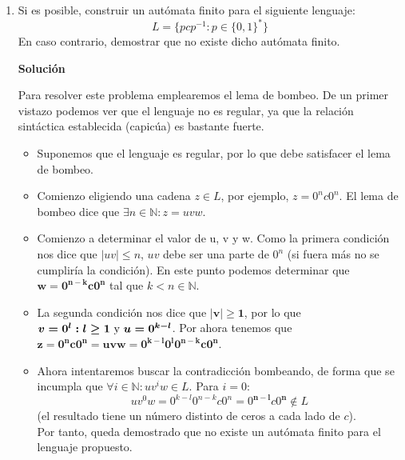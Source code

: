 \documentclass[12pt,spanish]{article}
\newenvironment{solution}{
	\par
	\textbf{Solución}
	\par
	\begin{center}
}
{
	\end{center}
}
\begin{document}
\begin{enumerate}
\begin{solution}
	\end{solution}
	\item Si es posible, construir un autómata finito para el siguiente lenguaje:
	\[
		L=\{pcp^{-1} : p \in \{0,1\}^{*}\}
	\]
	En caso contrario, demostrar que no existe dicho autómata finito.

	\begin{solution}
		Para resolver este problema emplearemos el lema de bombeo. De un primer vistazo podemos ver que el lenguaje no es regular, ya que la relación sintáctica establecida (capicúa) es bastante fuerte.
		\begin{itemize}
			\item Suponemos que el lenguaje es regular, por lo que debe satisfacer el lema de bombeo.
			\item Comienzo eligiendo una cadena $z \in L$, por ejemplo, $z=0^nc0^n$. El lema de bombeo dice que $\exists n \in \mathbb{N} : z=uvw$.
			\item Comienzo a determinar el valor de u, v y w. Como la primera condición nos dice que $|uv| \leq n$, $uv$ debe ser una parte de $0^n$ (si fuera más no se cumpliría la condición). En este punto podemos determinar que $\boldsymbol{w=0^{n-k}c0^n}$ tal que $k<n \in \mathbb{N}$.
			\item La segunda condición nos dice que $\boldsymbol{|v| \geq 1}$, por lo que $\boldsymbol{v=0^l : l \geq 1$ y $u=0^{k-l}}$.
			Por ahora tenemos que $\boldsymbol{z=0^nc0^n=uvw=0^{k-l}0^l0^{n-k}c0^n}$.
			\item Ahora intentaremos buscar la contradicción bombeando, de forma que se incumpla que $\forall i \in \mathbb{N} : uv^iw \in L$. Para $i=0$:
			\[
				uv^0w=0^{k-l}0^{n-k}c0^n=0^{\pmb{n-l}}c0^{\pmb{n}} \notin L
			\]
			(el resultado tiene un número distinto de ceros a cada lado de $c$).\\
			Por tanto, queda demostrado que no existe un autómata finito para el lenguaje propuesto.
		\end{itemize}
	\end{solution}


\end{enumerate}
\end{document}
